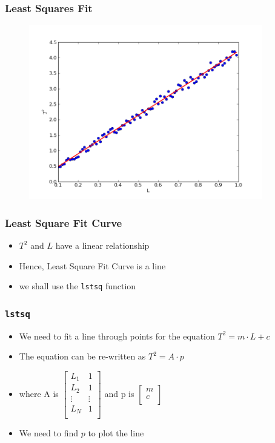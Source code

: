 \documentclass[14pt,compress]{beamer}
\newcommand{\typ}[1]{\lstinline{#1}}
\begin{document}
\begin{frame}[fragile]
\frametitle{Least Squares Fit}
\vspace{-0.15in}
\begin{figure}
\includegraphics[width=4in]{data/least-sq-fit.png}
\end{figure}
\end{frame}

\begin{frame}
\frametitle{Least Square Fit Curve}
\begin{itemize}
\item $T^2$ and $L$ have a linear relationship
\item Hence, Least Square Fit Curve is a line
\item we shall use the \typ{lstsq} function
\end{itemize}
\end{frame}

\begin{frame}[fragile]
\frametitle{\typ{lstsq}}
\begin{itemize}
\item We need to fit a line through points for the equation $T^2 = m \cdot L+c$
\item The equation can be re-written as $T^2 = A \cdot p$
\item where A is   
  $\begin{bmatrix}
  L_1 & 1 \\
  L_2 & 1 \\
  \vdots & \vdots\\
  L_N & 1 \\
  \end{bmatrix}$
  and p is 
  $\begin{bmatrix}
  m\\
  c\\
  \end{bmatrix}$
\item We need to find $p$ to plot the line
\end{itemize}
\end{frame}
\end{document}
